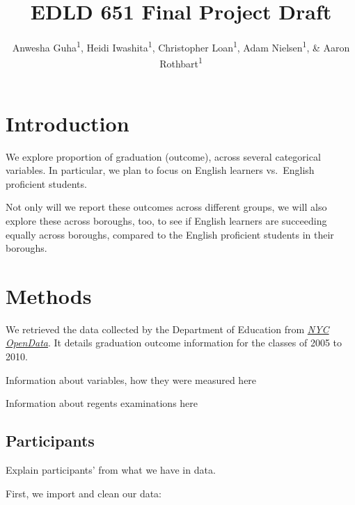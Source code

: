 \documentclass[
  english,
  man, fleqn, noextraspace]{apa6}
\title{EDLD 651 Final Project Draft}
\author{Anwesha Guha\textsuperscript{1}, Heidi Iwashita\textsuperscript{1}, Christopher Loan\textsuperscript{1}, Adam Nielsen\textsuperscript{1}, \& Aaron Rothbart\textsuperscript{1}}
\date{}
\affiliation{\vspace{0.5cm}\textsuperscript{1} University of Oregon}
\newenvironment{Shaded}{\begin{snugshade}}{\end{snugshade}}
\newcommand{\CommentTok}[1]{\textcolor[rgb]{0.56,0.35,0.01}{\textit{#1}}}
\newcommand{\KeywordTok}[1]{\textcolor[rgb]{0.13,0.29,0.53}{\textbf{#1}}}
\newcommand{\NormalTok}[1]{#1}
\newcommand{\OperatorTok}[1]{\textcolor[rgb]{0.81,0.36,0.00}{\textbf{#1}}}
\newcommand{\StringTok}[1]{\textcolor[rgb]{0.31,0.60,0.02}{#1}}
\begin{document}
\maketitle

\hypertarget{introduction}{%
\section{Introduction}\label{introduction}}

We explore proportion of graduation (outcome), across several categorical variables. In particular, we plan to focus on English learners vs.~English proficient students.

Not only will we report these outcomes across different groups, we will also explore these across boroughs, too, to see if English learners are succeeding equally across boroughs, compared to the English proficient students in their boroughs.

\hypertarget{methods}{%
\section{Methods}\label{methods}}

We retrieved the data collected by the Department of Education from \href{https://data.cityofnewyork.us/Education/2005-2010-Graduation-Outcomes-By-Borough/avir-tzek}{\emph{NYC OpenData}}. It details graduation outcome information for the classes of 2005 to 2010.

Information about variables, how they were measured here

Information about regents examinations here

\hypertarget{participants}{%
\subsection{Participants}\label{participants}}

Explain participants' from what we have in data.

First, we import and clean our data:

\begin{Shaded}
\end{Shaded}
\end{document}
